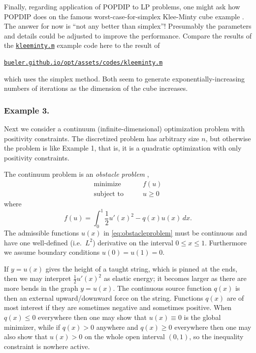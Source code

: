 \documentclass[11pt]{article}
\begin{document}
Finally, regarding application of POPDIP to LP problems, one might ask how POPDIP does on the famous worst-case-for-simplex Klee-Minty cube example \cite[chapter 9]{GrivaNashSofer2009}.  The answer for now is ``not any better than simplex''!   Presumably the parameters and details could be adjusted to improve the performance.  Compare the results of the \href{https://github.com/bueler/popdip/blob/main/matlab/kleeminty.m}{\texttt{kleeminty.m}} example code here to the result of

\medskip
\centerline{\href{https://bueler.github.io/opt/assets/codes/kleeminty.m}{\texttt{bueler.github.io/opt/assets/codes/kleeminty.m}}}

\medskip
\noindent which uses the simplex method.  Both seem to generate exponentially-increasing numbers of iterations as the dimension of the cube increases.


\subsubsection*{Example 3.}

Next we consider a continuum (infinite-dimensional) optimization problem with positivity constraints.  The discretized problem has arbitrary size $n$, but otherwise the problem is like Example 1, that is, it is a quadratic optimization with only positivity constraints.

The continuum problem is an \emph{obstacle problem} \cite[chapter 12]{Bueler2021},
\begin{equation}
\begin{matrix}
\text{minimize} \qquad & f(u) \\
\text{subject to} \qquad & u \ge 0
\end{matrix} \label{eq:obstacleproblem}
\end{equation}
where
\begin{equation}
    f(u) = \int_0^1 \frac{1}{2} u'(x)^2 - q(x) u(x)\,dx. \label{eq:obstaclefcn}
\end{equation}
The admissible functions $u(x)$ in \eqref{eq:obstacleproblem} must be continuous and have one well-defined (i.e.~$L^2$) derivative on the interval $0\le x \le 1$.  Furthermore we assume boundary conditions $u(0)=u(1)=0$.

If $y=u(x)$ gives the height of a taught string, which is pinned at the ends, then we may interpret $\frac{1}{2} u'(x)^2$ as elastic energy; it becomes larger as there are more bends in the graph $y=u(x)$.  The continuous source function $q(x)$ is then an external upward/downward force on the string.  Functions $q(x)$ are of most interest if they are sometimes negative and sometimes positive.  When $q(x)\le 0$ everywhere then one may show that $u(x)\equiv 0$ is the global minimizer, while if $q(x) > 0$ anywhere and $q(x)\ge 0$ everywhere then one may also show that $u(x)>0$ on the whole open interval $(0,1)$, so the inequality constraint is nowhere active.
\end{document}
